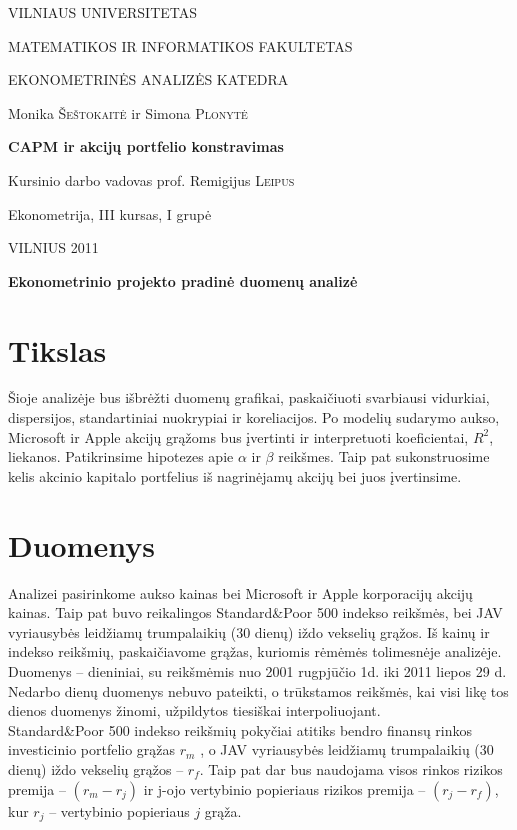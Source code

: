 \documentclass[a4paper]{article}
\begin{document}
\begin{titlepage}
\centerline{ \large VILNIAUS UNIVERSITETAS}
\bigskip
\centerline{\large MATEMATIKOS IR INFORMATIKOS FAKULTETAS}
\smallskip

\centerline{\large  EKONOMETRINĖS ANALIZĖS KATEDRA}
\vskip 200pt
\centerline{ \large Monika \textsc{Šeštokaitė} ir \large Simona \textsc{Plonytė}}
\vskip 50pt
\centerline{\bf \Large CAPM ir akcijų portfelio konstravimas}
\bigskip
\vskip 25pt
\centerline{Kursinio darbo vadovas prof. \large {Remigijus} \textsc{Leipus}}
\vskip 25pt
\hfill Ekonometrija, III kursas, I grupė
\vskip 100pt
\centerline{\large VILNIUS 2011}
\end{titlepage}

\pagebreak

\centerline{\bf \Large Ekonometrinio projekto pradinė duomenų analizė}

\section{ Tikslas}
Šioje analizėje bus išbrėžti duomenų grafikai, paskaičiuoti svarbiausi vidurkiai, dispersijos, standartiniai nuokrypiai ir koreliacijos. Po modelių sudarymo aukso, Microsoft ir Apple akcijų grąžoms bus įvertinti ir interpretuoti koeficientai, $ R^2 $, liekanos. Patikrinsime hipotezes apie $ \alpha $  ir $ \beta $ reikšmes. Taip pat sukonstruosime kelis akcinio kapitalo portfelius iš nagrinėjamų akcijų bei juos įvertinsime.

\section{ Duomenys}
Analizei pasirinkome aukso kainas bei Microsoft ir Apple korporacijų akcijų kainas. Taip pat buvo reikalingos Standard\&Poor 500 indekso reikšmės, bei JAV vyriausybės leidžiamų trumpalaikių (30 dienų) iždo vekselių grąžos. Iš kainų ir indekso reikšmių, paskaičiavome grąžas, kuriomis rėmėmės tolimesnėje analizėje. Duomenys -- dieniniai, su reikšmėmis nuo 2001 rugpjūčio 1d. iki 2011 liepos 29 d. Nedarbo dienų duomenys nebuvo pateikti, o trūkstamos reikšmės, kai visi likę tos dienos duomenys žinomi, užpildytos tiesiškai interpoliuojant.\\
  Standard\&Poor 500 indekso reikšmių pokyčiai atitiks bendro finansų rinkos investicinio portfelio grąžas $ r_m $ , o JAV vyriausybės leidžiamų trumpalaikių (30 dienų) iždo vekselių grąžos -- $ r_f $. Taip pat dar bus naudojama visos rinkos rizikos premija -- $ (r_m - r_j) $ ir j-ojo vertybinio popieriaus rizikos premija -- $ (r_j - r_f) $, kur $ r_j $ -- vertybinio popieriaus $ j $ grąža.
\end{document}
